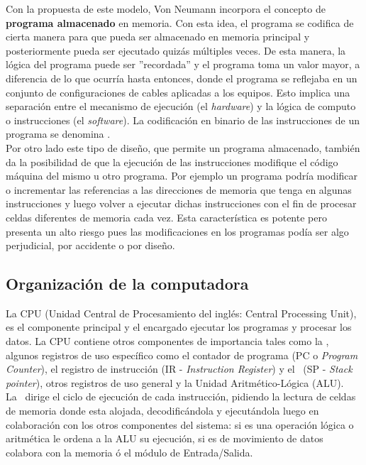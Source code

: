 Con la propuesta de este modelo, Von Neumann incorpora el concepto de \textbf{programa almacenado} en memoria. Con esta idea, el programa se codifica de cierta manera para que pueda ser almacenado en memoria principal y posteriormente pueda ser ejecutado quizás múltiples veces. De esta manera, la lógica del programa puede ser ''recordada'' y el programa toma un valor mayor, a diferencia de lo que ocurría hasta entonces, donde el programa se reflejaba en un conjunto de configuraciones de cables aplicadas a los equipos. Esto implica una separación entre el mecanismo de ejecución (el \textit{hardware}) y la lógica de computo o instrucciones (el \textit{software}). La codificación en binario de las instrucciones de un programa se denomina \textbf{\codmaq}.\\

Por otro lado este tipo de diseño, que permite un programa almacenado, también da la posibilidad de que la ejecución de las instrucciones modifique el código máquina del mismo u otro programa. Por ejemplo un programa podría modificar o incrementar las referencias a las direcciones de memoria que tenga en algunas instrucciones y luego volver a ejecutar dichas instrucciones con el fin de procesar celdas diferentes de memoria cada vez. Esta característica es potente pero presenta un alto riesgo pues las modificaciones en los programas podía ser algo perjudicial, por accidente o por diseño.

\subsection{Organización de la computadora}

La CPU (Unidad Central de Procesamiento del inglés: Central Processing Unit), es el componente principal y el encargado ejecutar los programas y procesar los datos. La CPU contiene otros componentes de importancia tales como la \UC, algunos registros de uso específico como el contador de programa (PC o \textit{Program Counter}), el registro de instrucción (IR - \textit{Instruction Register}) y el \SP\ (SP - \textit{Stack pointer}), otros registros de uso general y la Unidad Aritmético-Lógica (ALU).\\

La \UC\ dirige el ciclo de ejecución de cada instrucción, pidiendo la lectura de celdas de memoria donde esta alojada, decodificándola  y ejecutándola luego en colaboración con los otros componentes del sistema: si es una operación lógica o aritmética le ordena a la ALU su ejecución, si es de movimiento de datos colabora con la memoria ó el módulo de Entrada/Salida.\\

